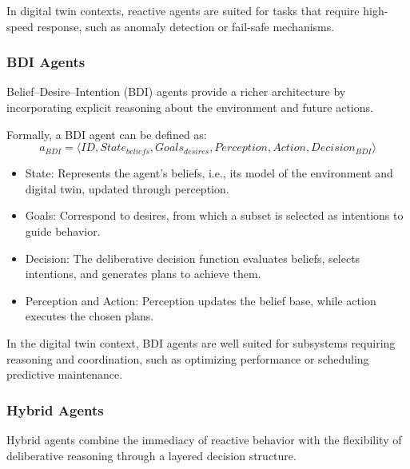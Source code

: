 In digital twin contexts, reactive agents are suited for tasks that require high-speed response, such as anomaly detection or fail-safe mechanisms.

\subsubsection{BDI Agents}

Belief–Desire–Intention (BDI) agents provide a richer architecture by incorporating explicit reasoning about the environment and future actions.

Formally, a BDI agent can be defined as:
\begin{equation*}
    a_{BDI}= \langle ID, State_{beliefs}, Goals_{desires}, Perception, Action, Decision_{BDI} \rangle
\end{equation*}
\begin{itemize}
    \item State: Represents the agent’s beliefs, i.e., its model of the environment and digital twin, updated through perception.

    \item Goals: Correspond to desires, from which a subset is selected as intentions to guide behavior.

    \item Decision: The deliberative decision function evaluates beliefs, selects intentions, and generates plans to achieve them.

    \item Perception and Action: Perception updates the belief base, while action executes the chosen plans.
\end{itemize}

In the digital twin context, BDI agents are well suited for subsystems requiring reasoning and coordination, such as optimizing performance or scheduling predictive maintenance.

\subsubsection{Hybrid Agents}

Hybrid agents combine the immediacy of reactive behavior with the flexibility of deliberative reasoning through a layered decision structure.

